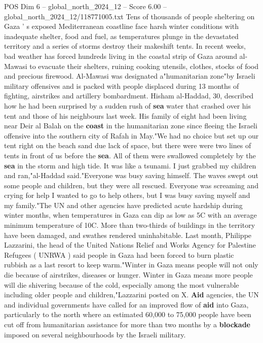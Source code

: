 \begin{textsample}{POS Dim 6 – global\_north\_2024\_12 – Score 6.00 – global\_north\_2024\_12/118771005.txt}  \label{ex:f6_pos_262}
Tens of thousands of people sheltering on Gaza ' s exposed Mediterranean coastline face harsh winter conditions with inadequate shelter, food and fuel, as temperatures plunge in the devastated territory and a series of storms destroy their makeshift tents.
In recent weeks, bad weather has forced hundreds living in the coastal strip of Gaza around al-Mawasi to evacuate their shelters, ruining cooking utensils, clothes, stocks of food and precious firewood.
Al-Mawasi was designated a"humanitarian zone"by Israeli military offensives and is packed with people displaced during 13 months of fighting, airstrikes and artillery bombardment.
Hisham al-Haddad, 30, described how he had been surprised by a sudden rush of \textbf{sea} water that crashed over his tent and those of his neighbours last week.
His family of eight had been living near Deir al Balah on the \textbf{coast} in the humanitarian zone since fleeing the Israeli offensive into the southern city of Rafah in May."We had no choice but set up our tent right on the beach sand due lack of space, but there were were two lines of tents in front of us before the \textbf{sea}.
All of them were swallowed completely by the \textbf{sea} in the storm and high tide.
It was like a tsunami.
I just grabbed my children and ran,"al-Haddad said."Everyone was busy saving himself.
The waves swept out some people and children, but they were all rescued.
Everyone was screaming and crying for help I wanted to go to help others, but I was busy saving myself and my family."The UN and other agencies have predicted acute hardship during winter months, when temperatures in Gaza can dip as low as 5C with an average minimum temperature of 10C.
More than two-thirds of buildings in the territory have been damaged, and swathes rendered uninhabitable.
Last month, Philippe Lazzarini, the head of the United Nations Relief and Works Agency for Palestine Refugees ( UNRWA ) said people in Gaza had been forced to burn plastic rubbish as a last resort to keep warm."Winter in Gaza means people will not only die because of airstrikes, diseases or hunger.
Winter in Gaza means more people will die shivering because of the cold, especially among the most vulnerable including older people and children,"Lazzarini posted on X. \textbf{Aid} agencies, the UN and individual governments have called for an improved flow of \textbf{aid} into Gaza, particularly to the north where an estimated 60,000 to 75,000 people have been cut off from humanitarian assistance for more than two months by a \textbf{blockade} imposed on several neighbourhoods by the Israeli military.

\end{textsample}
